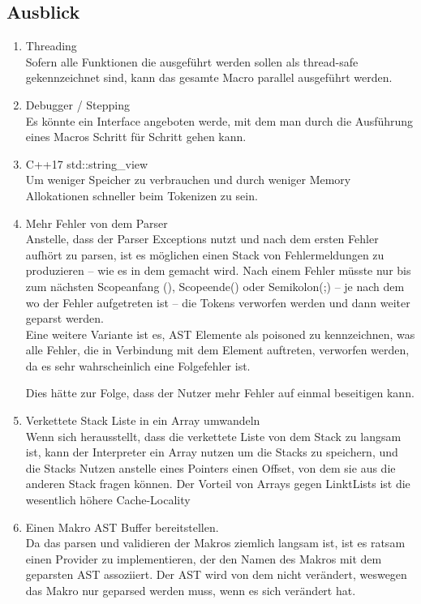   \subsection{Ausblick}
  \label{ssec:Ausblick}
    \begin{enumerate}[ref=\autoref{ssec:Ausblick}: Punkt \arabic*]
      \item Threading\\
        Sofern alle Funktionen die ausgeführt werden sollen als thread-safe gekennzeichnet sind, kann das gesamte Macro parallel ausgeführt werden.
      \item Debugger / Stepping\\
        Es könnte ein Interface angeboten werde, mit dem man durch die Ausführung eines Macros Schritt für Schritt gehen kann.
      \item C++17 std::string\_view\\
        Um weniger Speicher zu verbrauchen und durch weniger Memory Allokationen schneller beim Tokenizen zu sein.
      \item Mehr Fehler von dem Parser\label{enum:Mehr Fehler}\\
        Anstelle, dass der Parser Exceptions nutzt und nach dem ersten Fehler aufhört zu parsen, ist es möglichen einen Stack von Fehlermeldungen zu produzieren -- wie es in dem  gemacht wird. Nach einem Fehler müsste nur bis zum nächsten Scopeanfang ({), Scopeende(}) oder Semikolon(;) -- je nach dem wo der Fehler aufgetreten ist -- die Tokens verworfen werden und dann weiter geparst werden.\\
        Eine weitere Variante ist es, AST Elemente als poisoned zu kennzeichnen, was alle Fehler, die in Verbindung mit dem Element auftreten, verworfen werden, da es sehr wahrscheinlich eine Folgefehler ist.

        Dies hätte zur Folge, dass der Nutzer mehr Fehler auf einmal beseitigen kann.
      \item Verkettete Stack Liste in ein Array umwandeln\label{enum:linkedlist}\\
        Wenn sich herausstellt, dass die verkettete Liste von dem Stack zu langsam ist, kann der Interpreter ein Array nutzen um die Stacks zu speichern, und die Stacks Nutzen anstelle eines Pointers einen Offset, von dem sie aus die anderen Stack fragen können. Der Vorteil von Arrays gegen LinktLists ist die wesentlich höhere Cache-Locality
      \item Einen Makro AST Buffer bereitstellen.\label{enum:astbuffer}\\
        Da das parsen und validieren der Makros ziemlich langsam ist, ist es ratsam einen Provider zu implementieren, der den Namen des Makros mit dem geparsten AST assoziiert. Der AST wird von dem  nicht verändert, weswegen das Makro nur geparsed werden muss, wenn es sich verändert hat.


\end{enumerate}
